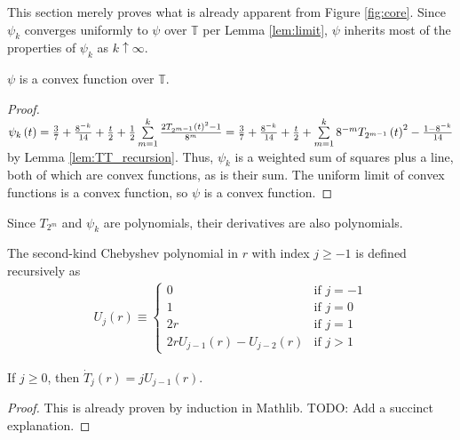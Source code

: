 This section merely proves what is already apparent from Figure \ref{fig:core}. Since $\psi_k$ converges uniformly to $\psi$ over $\mathbb{T}$ per Lemma \ref{lem:limit}, $\psi$ inherits most of the properties of $\psi_k$ as $k \uparrow \infty$.
\begin{lemma}
  \label{lem:convexity}
  $\psi$ is a convex function over $\mathbb{T}$.
\end{lemma}
  
\begin{proof}
  $\psi_k\left(t\right) = \frac{3}{7} + \frac{8^{-k}}{14} + \frac{t}{2} + \frac{1}{2} \sum\limits_{m = 1}^k  \frac{2 T_{2^{m - 1}}\left(t\right)^2 - 1}{8^m} = \frac{3}{7} + \frac{8^{-k}}{14} + \frac{t}{2} + \sum\limits_{m = 1}^k  8^{-m} T_{2^{m - 1}}\left(t\right)^2 - \frac{1 - 8^{-k}}{14}$ by Lemma \ref{lem:TT_recursion}. Thus, $\psi_k$ is a weighted sum of squares plus a line, both of which are convex functions, as is their sum. The uniform limit of convex functions is a convex function, so $\psi$ is a convex function.
\end{proof}

Since $T_{2^m}$ and $\psi_k$ are polynomials, their derivatives are also polynomials.
\begin{definition}
  \label{def:U}
  \leanok
  The second-kind Chebyshev polynomial in $r$ with index $j \geq -1$ is defined recursively as
  \begin{align*}
U_j\left(r\right) \equiv 
\begin{cases}
0 & \text{if } j = -1 \\
1 & \text{if } j = 0 \\
2r & \text{if } j = 1 \\
2 r U_{j - 1}\left(r\right) - U_{j - 2}\left(r\right) & \text{if } j > 1
\end{cases}
  \end{align*}
\end{definition}

\begin{lemma}[]
  \label{lem:T_derivative}
  \leanok
  If $j \geq 0$, then $\dot{T}_j\left(r\right) = j U_{j - 1}\left(r\right)$.
\end{lemma}
\begin{proof}
  \leanok
  This is already proven by induction in Mathlib. TODO: Add a succinct explanation.
\end{proof}

